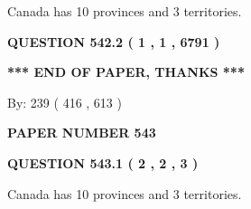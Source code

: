 \documentclass[12pt]{article}
\begin{document}
  
 
 
\noindent{}
 
 
Canada has 10  provinces and 3 territories.
 
 
 
 
  
\vspace{0.2in}
  
{\textbf{\Large{QUESTION
542.2 
 ( 1 , 1 , 6791 )
}}}
  
  
   
   
 \vspace{0.2in}
 
   
   
   
   
\vspace{1.0in} 
{\textbf{\large{ *** END OF PAPER, THANKS *** }}} 
   
   
\hspace{1.0in} By: 
 239 ( 416 ,  613 )
   
   
   
   
\newpage 
\setcounter{page}{ 
   543001 } 
   
   
   
   
 {\textbf{ \Large{ PAPER NUMBER  543  }}}
   
   
\vspace{0.2in}
   
   
   
   
   
   
 \vspace{0.2in}
 
 
 
 
   
   
  
\vspace{0.2in}
  
{\textbf{\Large{QUESTION
543.1 
 ( 2 , 2 , 3 )
}}}
  
  
 
 
\noindent{}
 
 
Canada has 10  provinces and 3 territories.
 
 
 
 
  
\vspace{0.2in}
  
\end{document}
